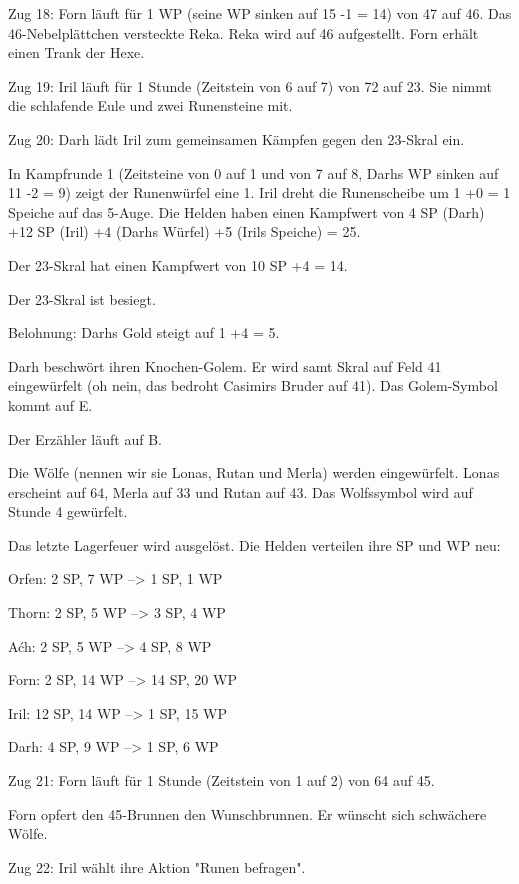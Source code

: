 \documentclass[10pt, a4paper, oneside]{book}
\begin{document}
{Zug 18: Forn läuft für 1 WP (seine WP sinken auf 15 -1 = 14) von 47 auf 46. Das 46-Nebelplättchen versteckte Reka. Reka wird auf 46 aufgestellt. Forn erhält einen Trank der Hexe.



Zug 19: Iril läuft für 1 Stunde (Zeitstein von 6 auf 7) von 72 auf 23. Sie nimmt die schlafende Eule und zwei Runensteine mit.



Zug 20: Darh lädt Iril zum gemeinsamen Kämpfen gegen den 23-Skral ein.

In Kampfrunde 1 (Zeitsteine von 0 auf 1 und von 7 auf 8, Darhs WP sinken auf 11 -2 = 9) zeigt der Runenwürfel eine 1. Iril dreht die Runenscheibe um 1 +0 = 1 Speiche auf das 5-Auge. Die Helden haben einen Kampfwert von 4 SP (Darh) +12 SP (Iril) +4 (Darhs Würfel) +5 (Irils Speiche) = 25.

Der 23-Skral hat einen Kampfwert von 10 SP +4 = 14.

Der 23-Skral ist besiegt.

Belohnung: Darhs Gold steigt auf 1 +4 = 5.

Darh beschwört ihren Knochen-Golem. Er wird samt Skral auf Feld 41 eingewürfelt (oh nein, das bedroht Casimirs Bruder auf 41). Das Golem-Symbol kommt auf E.

Der Erzähler läuft auf B.

Die Wölfe (nennen wir sie Lonas, Rutan und Merla) werden eingewürfelt. Lonas erscheint auf 64, Merla auf 33 und Rutan auf 43. Das Wolfssymbol wird auf Stunde 4 gewürfelt.

Das letzte Lagerfeuer wird ausgelöst. Die Helden verteilen ihre SP und WP neu:



Orfen: 2 SP, 7 WP –> 1 SP, 1 WP

Thorn: 2 SP, 5 WP –> 3 SP, 4 WP

Aćh: 2 SP, 5 WP –> 4 SP, 8 WP

Forn: 2 SP, 14 WP –> 14 SP, 20 WP

Iril: 12 SP, 14 WP –> 1 SP, 15 WP

Darh: 4 SP, 9 WP –> 1 SP, 6 WP



Zug 21: Forn läuft für 1 Stunde (Zeitstein von 1 auf 2) von 64 auf 45.

Forn opfert den 45-Brunnen den Wunschbrunnen. Er wünscht sich schwächere Wölfe.



Zug 22: Iril wählt ihre Aktion "Runen befragen".

}
\end{document}
